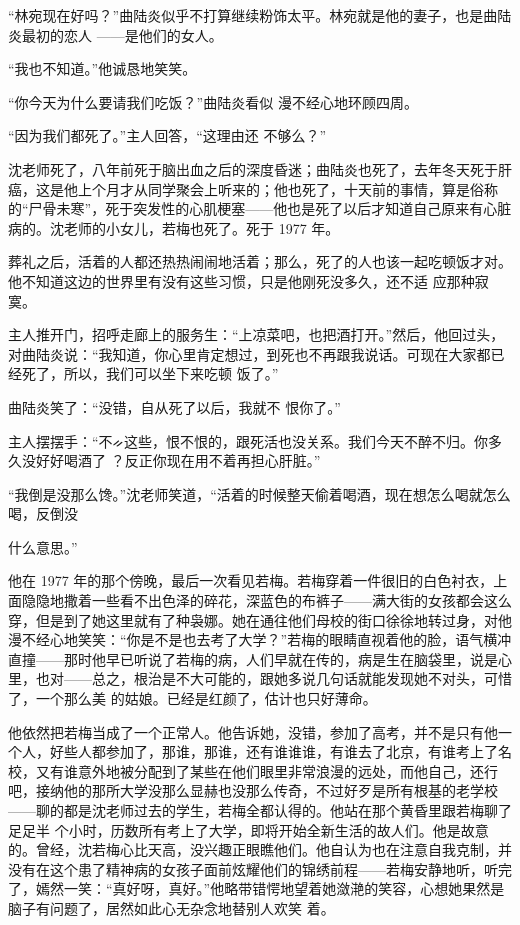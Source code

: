 \documentclass{article}
\begin{document}
“林宛现在好吗？”曲陆炎似乎不打算继续粉饰太平。林宛就是他的妻子，也是曲陆炎最初的恋人
——是他们的女人。 


“我也不知道。”他诚恳地笑笑。 

“你今天为什么要请我们吃饭？”曲陆炎看似
漫不经心地环顾四周。 

“因为我们都死了。”主人回答，“这理由还
不够么？” 

沈老师死了，八年前死于脑出血之后的深度昏迷；曲陆炎也死了，去年冬天死于肝癌，这是他上个月才从同学聚会上听来的；他也死了，十天前的事情，算是俗称的“尸骨未寒”，死于突发性的心肌梗塞——他也是死了以后才知道自己原来有心脏病的。沈老师的小女儿，若梅也死了。死于 1977 年。

\newpage

葬礼之后，活着的人都还热热闹闹地活着；那么，死了的人也该一起吃顿饭才对。他不知道这边的世界里有没有这些习惯，只是他刚死没多久，还不适
应那种寂寞。 

主人推开门，招呼走廊上的服务生：“上凉菜吧，也把酒打开。”然后，他回过头，对曲陆炎说：“我知道，你心里肯定想过，到死也不再跟我说话。可现在大家都已经死了，所以，我们可以坐下来吃顿
饭了。” 

曲陆炎笑了：“没错，自从死了以后，我就不
恨你了。” 

主人摆摆手：“不ᨀ这些，恨不恨的，跟死活也没关系。我们今天不醉不归。你多久没好好喝酒了
？反正你现在用不着再担心肝脏。” 

“我倒是没那么馋。”沈老师笑道，“活着的时候整天偷着喝酒，现在想怎么喝就怎么喝，反倒没

\newpage
什么意思。” 

他在 1977 年的那个傍晚，最后一次看见若梅。若梅穿着一件很旧的白色衬衣，上面隐隐地撒着一些看不出色泽的碎花，深蓝色的布裤子——满大街的女孩都会这么穿，但是到了她这里就有了种袅娜。她在通往他们母校的街口徐徐地转过身，对他漫不经心地笑笑：“你是不是也去考了大学？”若梅的眼睛直视着他的脸，语气横冲直撞——那时他早已听说了若梅的病，人们早就在传的，病是生在脑袋里，说是心里，也对——总之，根治是不大可能的，跟她多说几句话就能发现她不对头，可惜了，一个那么美
的姑娘。已经是红颜了，估计也只好薄命。 

他依然把若梅当成了一个正常人。他告诉她，没错，参加了高考，并不是只有他一个人，好些人都参加了，那谁，那谁，还有谁谁谁，有谁去了北京，有谁考上了名校，又有谁意外地被分配到了某些在他们眼里非常浪漫的远处，而他自己，还行吧，接纳他的那所大学没那么显赫也没那么传奇，不过好歹是所有根基的老学校——聊的都是沈老师过去的学生，若梅全都认得的。他站在那个黄昏里跟若梅聊了足足半
\newpage
个小时，历数所有考上了大学，即将开始全新生活的故人们。他是故意的。曾经，沈若梅心比天高，没兴趣正眼瞧他们。他自认为也在注意自我克制，并没有在这个患了精神病的女孩子面前炫耀他们的锦绣前程——若梅安静地听，听完了，嫣然一笑：“真好呀，真好。”他略带错愕地望着她潋滟的笑容，心想她果然是脑子有问题了，居然如此心无杂念地替别人欢笑
着。 
\end{document}
